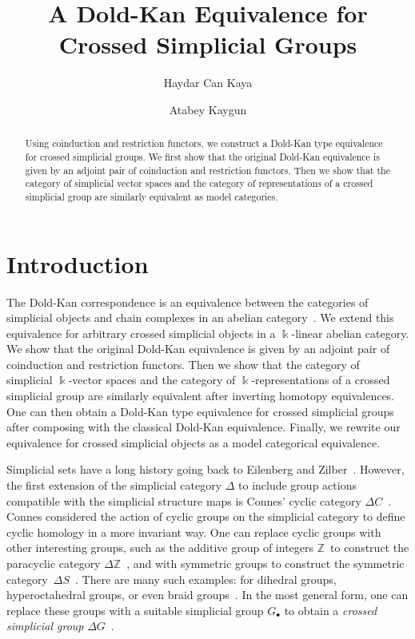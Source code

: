\documentclass[a4paper,11pt]{amsart}
\title{A Dold-Kan Equivalence for Crossed Simplicial Groups}
\author{Haydar Can Kaya}
\author{Atabey Kaygun}
\theoremstyle{definition}
\newcommand{\B}[1]{\mathbb{#1}}
\newcommand{\Simp}{{\Delta}}
\begin{document}
\begin{abstract}
  Using coinduction and restriction functors, we construct a Dold-Kan type equivalence for crossed simplicial groups.  We first show that the original Dold-Kan equivalence is given by an adjoint pair of coinduction and restriction functors. Then we show that the category of simplicial vector spaces and the category of representations of a crossed simplicial group are similarly equivalent as model categories.
\end{abstract}

\maketitle
\section*{Introduction}

The Dold-Kan correspondence is an equivalence between the categories of simplicial objects and chain complexes in an abelian category~\cite{dold1958homology, kan1958functors, dold1961homologie}. We extend this equivalence for arbitrary crossed simplicial objects in a $\Bbbk$-linear abelian category. We show that the original Dold-Kan equivalence is given by an adjoint pair of coinduction and restriction functors. Then we show that the category of simplicial $\Bbbk$-vector spaces and the category of $\Bbbk$-representations of a crossed simplicial group are similarly equivalent after inverting homotopy equivalences. One can then obtain a Dold-Kan type equivalence for crossed simplicial groups after composing with the classical Dold-Kan equivalence. Finally, we rewrite our equivalence for crossed simplicial objects as a model categorical equivalence.

Simplicial sets have a long history going back to Eilenberg and Zilber~\cite{eilenberg1950semi}. However, the first extension of the simplicial category $\Delta$ to include group actions compatible with the simplicial structure maps is Connes' cyclic category $\Delta C $~\cite{connes1983cohomologie, quillen1984cyclic}.  Connes considered the action of cyclic groups on the simplicial category to define cyclic homology in a more invariant way. One can replace cyclic groups with other interesting groups, such as the additive group of integers $\B{Z}$~to construct the paracyclic category $\Delta\B{Z}$~\cite{GetzlerJones:CyclicHomologyOfCrossedProductAlgebras}, and with symmetric groups to construct the symmetric category~$\Delta S$~\cite{Ault:SymmetricHomology}.  There are many such examples: for dihedral groups, hyperoctahedral groups, or even braid groups~\cite{Aboughazi:CrossedSimplicialGroups, Loday:CyclicHomology}. In the most general form, one can replace these groups with a suitable simplicial group $G_\bullet$ to obtain a \emph{crossed simplicial group} $\Simp G$~\cite{Krasauskas:SkewSimplicialGroups,fiedorowicz1991crossed}. 
\end{document}
